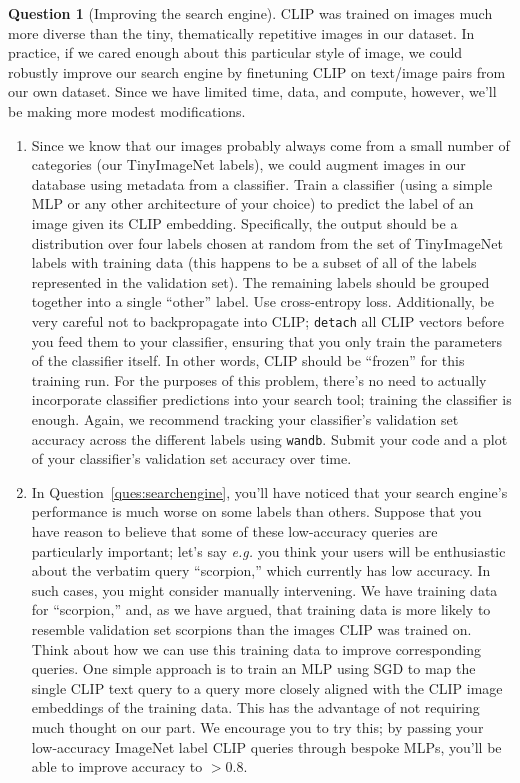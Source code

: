 \documentclass{article}
\theoremstyle{definition}
\newtheorem{subquestion}{Question}[question]
\begin{document}
\begin{subquestion}[Improving the search engine]
 CLIP was trained on images much more diverse than the tiny, thematically repetitive images in our dataset. In practice, if we cared enough about this particular style of image, we could robustly improve our search engine by finetuning CLIP on text/image pairs from our own dataset. Since we have limited time, data, and compute, however, we'll be making more modest modifications.

\begin{enumerate}
    \item Since we know that our images probably always come from a small number of categories (our TinyImageNet labels), we could augment images in our database using metadata from a classifier. Train a classifier (using a simple MLP or any other architecture of your choice) to predict the label of an image given its CLIP embedding. Specifically, the output should be a distribution over four labels chosen at random from the set of TinyImageNet labels with training data (this happens to be a subset of all of the labels represented in the validation set). The remaining labels should be grouped together into a single ``other'' label. Use cross-entropy loss. Additionally, be very careful not to backpropagate into CLIP; \texttt{detach} all CLIP vectors before you feed them to your classifier, ensuring that you only train the parameters of the classifier itself. In other words, CLIP should be ``frozen'' for this training run. For the purposes of this problem, there's no need to actually incorporate classifier predictions into your search tool; training the classifier is enough. Again, we recommend tracking your classifier's validation set accuracy across the different labels using \texttt{wandb}. Submit your code and a plot of your classifier's validation set accuracy over time.
    \item In Question~\ref{ques:searchengine}, you'll have noticed that your search engine's performance is much worse on some labels than others. Suppose that you have reason to believe that some of these low-accuracy queries are particularly important; let's say \textit{e.g.} you think your users will be enthusiastic about the verbatim query ``scorpion,'' which currently has low accuracy. In such cases, you might consider manually intervening. We have training data for ``scorpion,'' and, as we have argued, that training data is more likely to resemble validation set scorpions than the images CLIP was trained on. Think about how we can use this training data to improve corresponding queries. One simple approach is to train an MLP using SGD to map the single CLIP text query to a query more closely aligned with the CLIP image embeddings of the training data. This has the advantage of not requiring much thought on our part. We encourage you to try this; by passing your low-accuracy ImageNet label CLIP queries through bespoke MLPs, you'll be able to improve accuracy to $> 0.8$. \\
    

\end{enumerate}
\end{subquestion}
\end{document}
